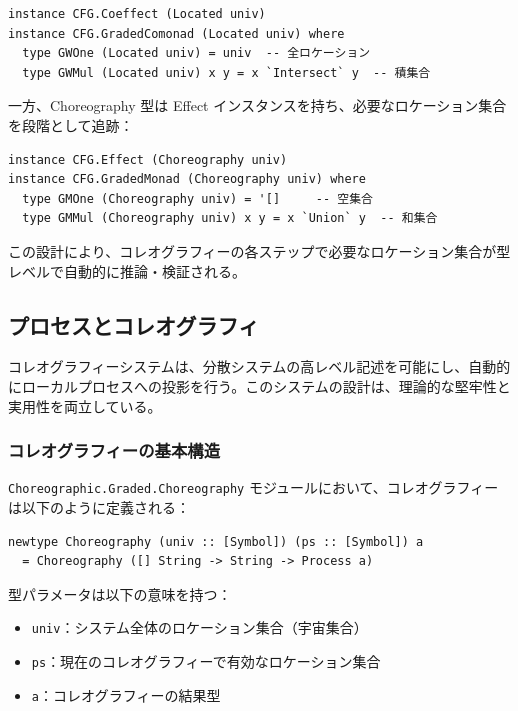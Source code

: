 \begin{verbatim}
instance CFG.Coeffect (Located univ)
instance CFG.GradedComonad (Located univ) where
  type GWOne (Located univ) = univ  -- 全ロケーション
  type GWMul (Located univ) x y = x `Intersect` y  -- 積集合
\end{verbatim}

一方、Choreography 型は Effect インスタンスを持ち、必要なロケーション集合を段階として追跡：

\begin{verbatim}
instance CFG.Effect (Choreography univ)
instance CFG.GradedMonad (Choreography univ) where
  type GMOne (Choreography univ) = '[]     -- 空集合
  type GMMul (Choreography univ) x y = x `Union` y  -- 和集合
\end{verbatim}

この設計により、コレオグラフィーの各ステップで必要なロケーション集合が型レベルで自動的に推論・検証される。

\subsection{プロセスとコレオグラフィ}
\label{sect:impl-proc-choro}

コレオグラフィーシステムは、分散システムの高レベル記述を可能にし、自動的にローカルプロセスへの投影を行う。このシステムの設計は、理論的な堅牢性と実用性を両立している。

\subsubsection{コレオグラフィーの基本構造}

\texttt{Choreographic.Graded.Choreography} モジュールにおいて、コレオグラフィーは以下のように定義される：

\begin{verbatim}
newtype Choreography (univ :: [Symbol]) (ps :: [Symbol]) a
  = Choreography ([] String -> String -> Process a)
\end{verbatim}

型パラメータは以下の意味を持つ：
\begin{itemize}
\item \texttt{univ}：システム全体のロケーション集合（宇宙集合）
\item \texttt{ps}：現在のコレオグラフィーで有効なロケーション集合
\item \texttt{a}：コレオグラフィーの結果型
\end{itemize}

